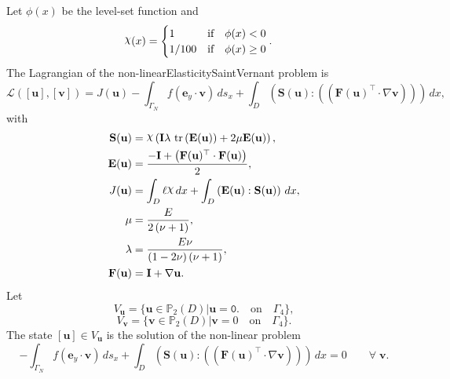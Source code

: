 \documentclass[preview]{standalone}
\let\oldcdot\cdot
\let\cdot\oldcdot
\begin{document}
Let $\phi(x)$ be the level-set function and
 \begin{align*}\raisebox{\depth}{$\chi$}(x) &= \begin{cases} 1 & \mbox{if}\quad \phi(x) < 0 \\ 1/100 & \mbox{if}\quad \phi(x)  \ge 0 \end{cases}.\end{align*}
The Lagrangian of the non-linearElasticitySaintVernant problem is
\begin{dmath*}
\mathcal L(\left[ {\mathbf{ u }}\right],\left[ {\mathbf{ v }}\right]) = J({\mathbf{ u }}) -  \int_{\Gamma_N} f \left( \mathbf e_y \cdot {\mathbf{ v }} \right) \,ds_x +  \int_{D} \left( \mathbf S({\mathbf{ u }}) \mathrel{:} \left( \left(  \mathbf F({\mathbf{ u }})^\top  \cdot  \nabla {\mathbf{ v }}  \right) \right)\right) \,dx , 
\end{dmath*}
with 
\begin{align*}
\mathbf S({\mathbf{ u }}) &= \raisebox{\depth}{$\chi$} \left(\mathbf{I} \lambda  \,\operatorname{tr}\left(\mathbf E({\mathbf{ u }})\right)  + 2 \mu \mathbf E({\mathbf{ u }})\right),\\
\mathbf E({\mathbf{ u }}) &= \frac{- \mathbf{I} + \left(  \mathbf F({\mathbf{ u }})^\top  \cdot \mathbf F({\mathbf{ u }}) \right)}{2},\\
J({\mathbf{ u }}) &=  \int_{D} \ell \raisebox{\depth}{$\chi$} \,dx +  \int_{D} \left( \mathbf E({\mathbf{ u }}) \mathrel{:} \mathbf S({\mathbf{ u }}) \right) \,dx,\\
\mu &= \frac{E}{2 \left(\nu + 1\right)},\\
\lambda &= \frac{E \nu}{\left(1 - 2 \nu\right) \left(\nu + 1\right)},\\
\mathbf F({\mathbf{ u }}) &= \mathbf{I} +  \nabla {\mathbf{ u }} .
 \end{align*}
Let
\begin{equation*}
V_{{\mathbf{ u }}} = \{ {\mathbf{ u }} \in \mathbb P_{2}(D)| {\mathbf{ u }} = \mathtt{\text{0.}}  \quad \text{{on}} \quad\Gamma_{4} \},\end{equation*}
\begin{equation*}
V_{{\mathbf{ v }}} = \{ {\mathbf{ v }} \in \mathbb P_{2}(D)| {\mathbf{ v }} = 0  \quad \text{{on}} \quad\Gamma_{4} \}.\end{equation*}
The state $\left[ {\mathbf{ u }}\right] \in  V_{{\mathbf{ u }}}$ is the solution of the non-linear problem
\begin{dmath*}
-  \int_{\Gamma_N} f \left( \mathbf e_y \cdot {\mathbf{ v }} \right) \,ds_x +  \int_{D} \left( \mathbf S({\mathbf{ u }}) \mathrel{:} \left( \left(  \mathbf F({\mathbf{ u }})^\top  \cdot  \nabla {\mathbf{ v }}  \right) \right)\right) \,dx = 0\qquad \forall\; {\mathbf{ v }} . 
\end{dmath*}
\end{document}
